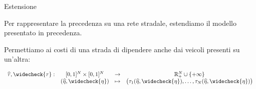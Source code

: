 \begin{frame}{Estensione}

\begin{block}
Per rappresentare la precedenza su una rete stradale,
estendiamo il modello presentato in precedenza.
\end{block}

\vspace{0.3cm}

Permettiamo ai costi di una strada di dipendere anche dai
veicoli presenti su un'altra:

\vspace{0.3cm}

\begin{equation*}
\label{eq:12}
\begin{split}
\begin{array}{rccc}
\widehat{\tau}, \widecheck{\tau}: & [0,1]^N\times[0,1]^N & \to & \mathbb{R}_+^N \cup \{+\infty\}\\
& (\widehat{\eta},\widecheck{\eta}) & \mapsto &
\bigl(
\tau_1(\widehat{\eta},\widecheck{\eta}),
\dots,
\tau_N(\widehat{\eta},\widecheck{\eta})
\bigr)
\end{array}
\end{split}
\end{equation*}

\end{frame}
